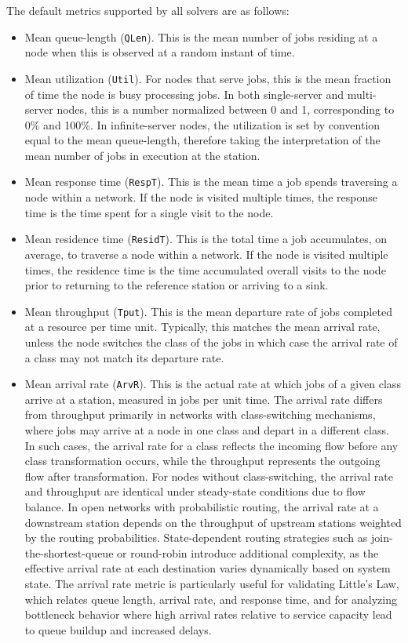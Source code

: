 The default metrics supported by all solvers are as follows:
\begin{itemize}
\item Mean queue-length (\texttt{QLen}). This is the mean number of jobs residing at a node when this is observed at a random instant of time.
\item Mean utilization (\texttt{Util}). For nodes that serve jobs, this is the mean fraction of time the node is busy processing jobs. In both single-server and multi-server nodes, this is a number normalized between 0 and 1, corresponding to 0\% and 100\%. In infinite-server nodes, the utilization is set by convention equal to the mean queue-length, therefore taking the interpretation of the mean number of jobs in execution at the station.
\item Mean response time (\texttt{RespT}). This is the mean time a job spends traversing a node within a network. If the node is visited multiple times, the response time is the time spent for a single visit to the node.
\item Mean residence time (\texttt{ResidT}). This is the total time a job accumulates, on average, to traverse a node within a network. If the node is visited multiple times, the residence time is the time accumulated overall visits to the node prior to returning to the reference station or arriving to a sink.
\item Mean throughput (\texttt{Tput}). This is the mean departure rate of jobs completed at a resource per time unit. Typically, this matches the mean arrival rate, unless the node switches the class of the jobs in which case the arrival rate of a class may not match its departure rate.
\item Mean arrival rate (\texttt{ArvR}). This is the actual rate at which jobs of a given class arrive at a station, measured in jobs per unit time. The arrival rate differs from throughput primarily in networks with class-switching mechanisms, where jobs may arrive at a node in one class and depart in a different class. In such cases, the arrival rate for a class reflects the incoming flow before any class transformation occurs, while the throughput represents the outgoing flow after transformation. For nodes without class-switching, the arrival rate and throughput are identical under steady-state conditions due to flow balance. In open networks with probabilistic routing, the arrival rate at a downstream station depends on the throughput of upstream stations weighted by the routing probabilities. State-dependent routing strategies such as join-the-shortest-queue or round-robin introduce additional complexity, as the effective arrival rate at each destination varies dynamically based on system state. The arrival rate metric is particularly useful for validating Little's Law, which relates queue length, arrival rate, and response time, and for analyzing bottleneck behavior where high arrival rates relative to service capacity lead to queue buildup and increased delays.
\end{itemize}
